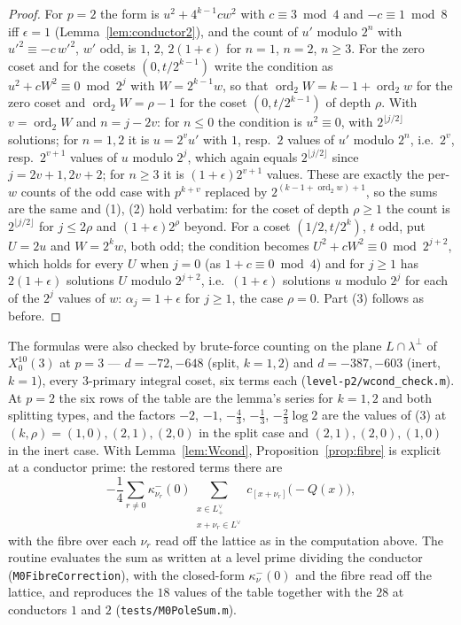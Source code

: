 \documentclass[11pt,reqno]{amsart}
\theoremstyle{plain}
\theoremstyle{definition}
\DeclareMathOperator{\ord}{ord}
\newcommand{\Ldual}{L^{\vee}}
\newcommand{\Lp}{L_{+}}
\begin{document}
\begin{proof}
For $p=2$ the form is $u^2+4^{k-1}cw^2$ with $c\equiv3\bmod4$ and $-c\equiv1\bmod8$ iff
$\epsilon=1$ (Lemma~\ref{lem:conductor2}), and the count of $u'$ modulo $2^n$ with $u'^2\equiv
-c\,w'^2$, $w'$ odd, is $1$, $2$, $2(1+\epsilon)$ for $n=1$, $n=2$, $n\ge3$. For the zero coset
and for the cosets $(0,t/2^{k-1})$ write the condition as $u^2+cW^2\equiv0\bmod2^j$ with
$W=2^{k-1}w$, so that $\ord_2W=k-1+\ord_2w$ for the zero coset and $\ord_2W=\rho-1$ for the coset
$(0,t/2^{k-1})$ of depth $\rho$. With $v=\ord_2W$ and $n=j-2v$: for $n\le0$ the condition is
$u^2\equiv0$, with $2^{\lfloor j/2\rfloor}$ solutions; for $n=1,2$ it is $u=2^vu'$ with $1$,
resp.\ $2$ values of $u'$ modulo $2^n$, i.e.\ $2^{v}$, resp.\ $2^{v+1}$ values of $u$ modulo $2^j$,
which again equals $2^{\lfloor j/2\rfloor}$ since $j=2v+1,2v+2$; for $n\ge3$ it is $(1+\epsilon)
2^{v+1}$ values. These are exactly the per-$w$ counts of the odd case with $p^{k+v}$ replaced by
$2^{(k-1+\ord_2 w)+1}$, so the sums are the same and (1), (2) hold verbatim: for the coset of depth
$\rho\ge1$ the count is $2^{\lfloor j/2\rfloor}$ for $j\le2\rho$ and $(1+\epsilon)2^\rho$ beyond.
For a coset $(1/2,t/2^k)$, $t$ odd, put $U=2u$ and $W=2^kw$, both odd; the condition becomes
$U^2+cW^2\equiv0\bmod2^{j+2}$, which holds for every $U$ when $j=0$ (as $1+c\equiv0\bmod4$) and for
$j\ge1$ has $2(1+\epsilon)$ solutions $U$ modulo $2^{j+2}$, i.e.\ $(1+\epsilon)$ solutions $u$
modulo $2^j$ for each of the $2^j$ values of $w$: $\alpha_j=1+\epsilon$ for $j\ge1$, the case
$\rho=0$. Part (3) follows as before.
\end{proof}

The formulas were also checked by brute-force counting on the plane $L\cap\lambda^\perp$ of
$X_0^{10}(3)$ at $p=3$ --- $d=-72,-648$ (split, $k=1,2$) and $d=-387,-603$ (inert, $k=1$), every
$3$-primary integral coset, six terms each (\texttt{level-p2/wcond\_check.m}). At $p=2$ the
six rows of the table are the lemma's series for $k=1,2$ and both splitting types, and the factors
$-2$, $-1$, $-\tfrac43$, $-\tfrac13$, $-\tfrac23\log2$ are the values of (3) at
$(k,\rho)=(1,0),(2,1),(2,0)$ in the split case and $(2,1),(2,0),(1,0)$ in the inert case. With
Lemma~\ref{lem:Wcond}, Proposition~\ref{prop:fibre} is explicit at a conductor prime: the restored
terms there are
\[
  -\frac14\sum_{r\neq0}\kappa^-_{\nu_r}(0)\sum_{\substack{x\in\Lp^\vee\\ x+\nu_r\in\Ldual}}
  c_{[x+\nu_r]}\bigl(-Q(x)\bigr),
\]
with the fibre over each $\nu_r$ read off the lattice as in the computation above. The routine
evaluates the sum as written at a level prime dividing the conductor (\texttt{M0FibreCorrection}),
with the closed-form $\kappa^-_\nu(0)$ and the fibre read off the lattice, and reproduces the $18$
values of the table together with the $28$ at conductors $1$ and $2$ (\texttt{tests/M0PoleSum.m}).
\end{document}
